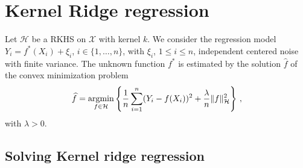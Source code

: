 \documentclass[a4paper,10pt,fleqn]{article}
\newcommand{\1}{\ensuremath{\mathbbm{1}}}
\newcommand{\argmin}{\mathop{\textrm{argmin}}}
\begin{document}
\section{Kernel Ridge regression}
Let $\mathcal{H}$ be a RKHS on $\mathcal{X}$ with kernel $k$.  We consider the regression model $Y_{i}=f^*(X_{i})+\xi_{i}$, $i\in\{1,\ldots,n\}$, with $\xi_{i}$, $1\leq i \leq n$,  independent centered noise with finite variance. The unknown function $f^*$ is estimated  by the solution 
$\widehat f$  of the convex minimization problem
$$\widehat f=\argmin_{f\in\mathcal{H}}\left\{{1\over n}\sum_{i=1}^n(Y_{i}-f(X_{i}))^2+{\lambda\over n} \|f\|_{\mathcal{H}}^2\right\}\,,$$
with $\lambda>0$.

\subsection{Solving Kernel ridge regression}
\end{document}
